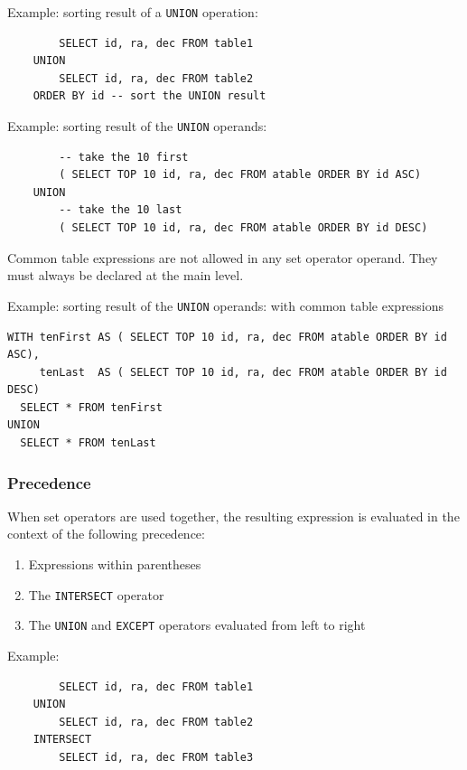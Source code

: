 \documentclass[11pt,a4paper]{ivoa}
\begin{document}
Example: sorting result of a \verb:UNION: operation:

\begin{verbatim}
        SELECT id, ra, dec FROM table1
    UNION
        SELECT id, ra, dec FROM table2
    ORDER BY id -- sort the UNION result
\end{verbatim}

Example: sorting result of the \verb:UNION: operands:

\begin{verbatim}
        -- take the 10 first
        ( SELECT TOP 10 id, ra, dec FROM atable ORDER BY id ASC)
    UNION
        -- take the 10 last
        ( SELECT TOP 10 id, ra, dec FROM atable ORDER BY id DESC)
\end{verbatim}

Common table expressions are not allowed in any set operator operand. They must
always be declared at the main level.

Example: sorting result of the \verb:UNION: operands: with common table
expressions

\begin{verbatim}
WITH tenFirst AS ( SELECT TOP 10 id, ra, dec FROM atable ORDER BY id ASC),
     tenLast  AS ( SELECT TOP 10 id, ra, dec FROM atable ORDER BY id DESC)
  SELECT * FROM tenFirst
UNION
  SELECT * FROM tenLast
\end{verbatim}

\subsubsection{Precedence}

When set operators are used together, the resulting expression is
evaluated in the context of the following precedence:

\begin{enumerate}
    \item Expressions within parentheses
    \item The \verb:INTERSECT: operator
    \item The \verb:UNION: and \verb:EXCEPT: operators evaluated from left to right
\end{enumerate}

Example:

\begin{verbatim}
        SELECT id, ra, dec FROM table1
    UNION
        SELECT id, ra, dec FROM table2
    INTERSECT
        SELECT id, ra, dec FROM table3
\end{verbatim}
\end{document}
